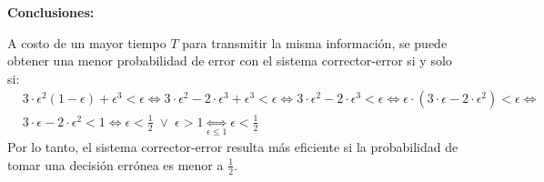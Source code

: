 \documentclass[11pt]{article}
\begin{document}
\textbf{Conclusiones:} 

A costo de un mayor tiempo $T$ para transmitir la misma información, se puede 
obtener una menor probabilidad de error con el sistema corrector-error si y solo si:
\begin{align*}
  & 3\cdot\epsilon^2(1-\epsilon) + \epsilon^3 < \epsilon \iff 3\cdot\epsilon^2 -
  2\cdot\epsilon^3 + \epsilon^3 < \epsilon \iff 3\cdot\epsilon^2 - 
  2\cdot\epsilon^3 < \epsilon \iff \epsilon\cdot(3\cdot\epsilon-2\cdot\epsilon^2) <
  \epsilon \iff \\
  & 3\cdot\epsilon-2\cdot\epsilon^2 < 1 \iff \epsilon < \frac{1}{2} \;\lor\; \epsilon > 1
  \underset{\epsilon \leq 1}{\iff} \epsilon < \frac{1}{2}
\end{align*}
Por lo tanto, el sistema corrector-error resulta más eficiente si la probabilidad
de tomar una decisión errónea es menor a $\frac{1}{2}$.
\end{document}
